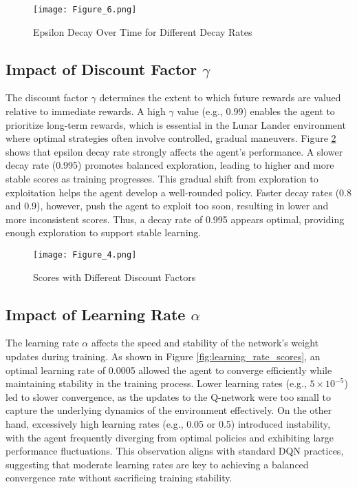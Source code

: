 \documentclass[conference]{IEEEtran}
\begin{document}
\begin{figure}[h]
    \centering
    \texttt{[image: Figure\_6.png]}
    \caption{Epsilon Decay Over Time for Different Decay Rates}
    \label{fig:epsilon_decay_over_time}
\end{figure}

\subsection{Impact of Discount Factor $\gamma$}
The discount factor $\gamma$ determines the extent to which future rewards are valued relative to immediate rewards. A high $\gamma$ value (e.g., 0.99) enables the agent to prioritize long-term rewards, which is essential in the Lunar Lander environment where optimal strategies often involve controlled, gradual maneuvers. Figure \ref{fig:gamma_scores} shows that epsilon decay rate strongly affects the agent’s performance. A slower decay rate (0.995) promotes balanced exploration, leading to higher and more stable scores as training progresses. This gradual shift from exploration to exploitation helps the agent develop a well-rounded policy. Faster decay rates (0.8 and 0.9), however, push the agent to exploit too soon, resulting in lower and more inconsistent scores. Thus, a decay rate of 0.995 appears optimal, providing enough exploration to support stable learning.

\begin{figure}[h]
    \centering
    \texttt{[image: Figure\_4.png]}
    \caption{Scores with Different Discount Factors}
    \label{fig:gamma_scores}
\end{figure}

\subsection{Impact of Learning Rate $\alpha$}
The learning rate $\alpha$ affects the speed and stability of the network's weight updates during training. As shown in Figure \ref{fig:learning_rate_scores}, an optimal learning rate of 0.0005 allowed the agent to converge efficiently while maintaining stability in the training process. Lower learning rates (e.g., $5 \times 10^{-5}$) led to slower convergence, as the updates to the Q-network were too small to capture the underlying dynamics of the environment effectively. On the other hand, excessively high learning rates (e.g., 0.05 or 0.5) introduced instability, with the agent frequently diverging from optimal policies and exhibiting large performance fluctuations. This observation aligns with standard DQN practices, suggesting that moderate learning rates are key to achieving a balanced convergence rate without sacrificing training stability.
\end{document}
